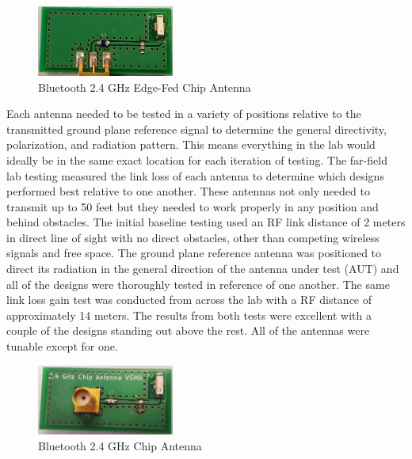 \documentclass[journal,compsoc]{IEEEtran}
\begin{document}
\begin{figure}[ht]	%
\centering
\includegraphics[width=0.4\textwidth]{2_4GHzChipAntenna.jpg}
\caption{Bluetooth 2.4 GHz Edge-Fed Chip Antenna}
\label{2.4 Chip}
\end{figure}


Each antenna needed to be tested in a variety of positions relative to the transmitted ground plane reference signal to determine the general directivity, polarization, and radiation pattern.  This means everything in the lab would ideally be in the same exact location for each iteration of testing.  The far-field lab testing measured the link loss of each antenna to determine which designs performed best relative to one another.   These antennas not only needed to transmit up to 50 feet but they needed to work properly in any position and behind obstacles.  The initial baseline testing used an RF link distance of 2 meters in direct line of sight with no direct obstacles, other than competing wireless signals and free space.  The ground plane reference antenna was positioned to direct its radiation in the general direction of the antenna under test (AUT) and all of the designs were thoroughly tested in reference of one another.  The same link loss gain test was conducted from across the lab with a RF distance of approximately 14 meters.  The results from both tests were excellent with a couple of the designs standing out above the rest.  All of the antennas were tunable except for one.

\begin{figure}[ht]	%
\centering
\includegraphics[width=0.4\textwidth]{2_4GHzVChipAntenna.jpg}
\caption{Bluetooth 2.4 GHz Chip Antenna}
\label{2.4 Chip}
\end{figure}
\end{document}
